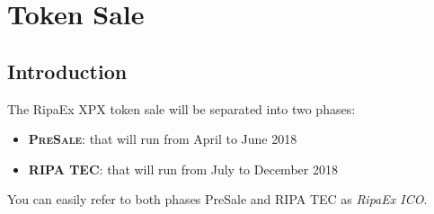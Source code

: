 \documentclass[11pt,fleqn,oneside]{book} %
\begin{document}
\chapter{Token Sale}
\section{Introduction}
The RipaEx XPX token sale will be separated into two phases:
	\begin{itemize}
		\item \textbf{\textsc{PreSale}}: that will run from April to June 2018
		\item \textbf{\textsc{RIPA TEC}}: that will run from July to December 2018
	\end{itemize}
\vspace{5mm}
You can easily refer to both phases PreSale and RIPA TEC as \textit{RipaEx ICO}.
\end{document}

